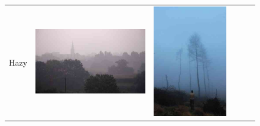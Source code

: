 \begin{figure}
\begin{minipage}[t]{\textwidth}
\begin{tabular}{m{.01\linewidth} m{.16\linewidth} m{.16\linewidth} m{.16\linewidth} m{.16\linewidth} m{.16\linewidth}}
    \begin{turn}{90}\small{Hazy}\end{turn} &
    \includegraphics[width=\linewidth]{../style/figures/flickr_on_flickr/pred_style_Hazy/0.jpg} &
    \includegraphics[width=\linewidth]{../style/figures/flickr_on_flickr/pred_style_Hazy/1.jpg} &

\end{tabular}
\end{minipage}
\end{figure}
